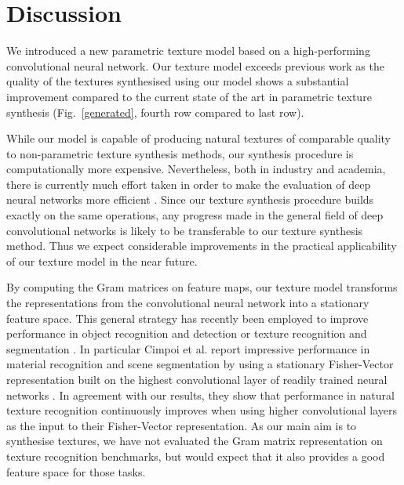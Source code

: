 \documentclass{article} %
\begin{document}
\section{Discussion}
We introduced a new parametric texture model based on a high-performing convolutional neural network.
Our texture model exceeds previous work as the quality of the textures synthesised using our model shows a substantial improvement compared to the current state of the art in parametric texture synthesis (Fig.~\ref{generated}, fourth row compared to last row).

While our model is capable of producing natural textures of comparable quality to non-parametric texture synthesis methods, our synthesis procedure is computationally more expensive. Nevertheless, both in industry and academia, there is currently much effort taken in order to make the evaluation of deep neural networks more efficient \cite{jaderberg_speeding_2014, denton_exploiting_2014, lebedev_speeding-up_2014}. Since our texture synthesis procedure builds exactly on the same operations, any progress made in the general field of deep convolutional networks is likely to be transferable to our texture synthesis method. Thus we expect considerable improvements in the practical applicability of our texture model in the near future.

By computing the Gram matrices on feature maps, our texture model transforms the representations from the convolutional neural network into a stationary feature space. This general strategy has recently been employed to improve performance in object recognition and detection \cite{he_spatial_2014} or texture recognition and segmentation \cite{cimpoi_deep_2014}. In particular Cimpoi et al. report impressive performance in material recognition and scene segmentation by using a stationary Fisher-Vector representation built on the highest convolutional layer of readily trained neural networks \cite{cimpoi_deep_2014}.  In agreement with our results, they show that performance in natural texture recognition continuously improves when using higher convolutional layers as the input to their Fisher-Vector representation. As our main aim is to synthesise textures, we have not evaluated the Gram matrix representation on texture recognition benchmarks, but would expect that it also provides a good feature space for those tasks.
\end{document}

